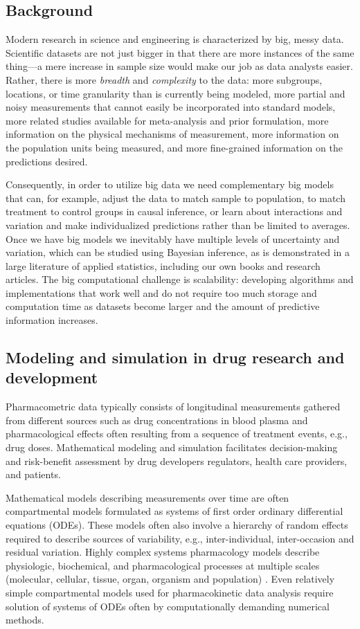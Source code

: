 \documentclass[11pt]{article}
\begin{document}
\subsection*{Background}

Modern research in science and engineering is characterized by big,
messy data. Scientific datasets are not just bigger in that there are
more instances of the same thing---a mere increase in sample size
would make our job as data analysts easier. Rather, there is more {\em
  breadth} and {\em complexity} to the data: more subgroups,
locations, or time granularity than is currently being modeled, more
partial and noisy measurements that cannot easily be incorporated into
standard models, more related studies available for meta-analysis and
prior formulation, more information on the physical mechanisms of
measurement, more information on the population units being measured,
and more fine-grained information on the predictions desired.

Consequently, in order to utilize big data we need complementary big
models that can, for example, adjust the data to match sample to
population, to match treatment to control groups in causal inference,
or learn about interactions and variation and make individualized
predictions rather than be limited to averages.  Once we have big
models we inevitably have multiple levels of uncertainty and
variation, which can be studied using Bayesian inference, as is
demonstrated in a large literature of applied statistics, including
our own books and research articles. The big computational challenge
is scalability: developing algorithms and implementations that work
well and do not require too much storage and computation time as
datasets become larger and the amount of predictive information
increases.

\subsection*{Modeling and simulation in drug research and development}

Pharmacometric data typically consists of longitudinal measurements
gathered from different sources such as drug concentrations in blood
plasma and pharmacological effects often resulting from a sequence of
treatment events, e.g., drug doses. Mathematical modeling and
simulation facilitates decision-making and risk-benefit assessment by
drug developers regulators, health care providers, and patients.

Mathematical models describing measurements over time are often
compartmental models formulated as systems of first order ordinary
differential equations (ODEs). These models often also involve a
hierarchy of random effects required to describe sources of
variability, e.g., inter-individual, inter-occasion and residual
variation. Highly complex systems pharmacology models describe
physiologic, biochemical, and pharmacological processes at multiple
scales (molecular, cellular, tissue, organ, organism and population)
\citep[e.g.,][]{baron-et-al:2013, peterson-rigg:2010}. Even relatively
simple compartmental models used for pharmacokinetic data analysis
require solution of systems of ODEs often by computationally demanding
numerical methods.
\end{document}
